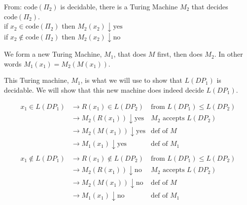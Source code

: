 From: $\text{code}(\Pi_2)$ is decidable, there is a Turing Machine $M_2$ that 
decides $\text{code}(\Pi_2)$. \\
if $x_2 \in \text{code}(\Pi_2)$ then $M_2(x_2) \downarrow \text{yes}$\\
if $x_2 \notin \text{code}(\Pi_2)$ then $M_2(x_2) \downarrow \text{no}$

We form a new Turing Machine, $M_1$, that does $M$ first, 
then does $M_2$. In other words $M_1(x_1) = M_2(M(x_1))$.



This Turing machine, $M_1$, is what we will use to show that $L(DP_1)$ is decidable.
We will show that this new machine does indeed decide $L(DP_1)$.

\[ 
\begin{array}{rll}
x_1 \in L(DP_1) &\rightarrow  R(x_1) \in L(DP_2) & \text{from } L(DP_1) \leqslant L(DP_2) \\
               &\rightarrow  M_2(R(x_1)) \downarrow \text{yes} & M_2 \text{ accepts } L(DP_2)  \\
               &\rightarrow  M_2(M(x_1)) \downarrow \text{yes} & \text{def of } M \\
               &\rightarrow  M_1(x_1) \downarrow \text{yes} & \text{def of } M_1  \\
               & & \\
x_1 \notin L(DP_1) &\rightarrow  R(x_1) \notin L(DP_2) & \text{from } L(DP_1) \leqslant L(DP_2) \\
               &\rightarrow  M_2(R(x_1)) \downarrow \text{no} & M_2 \text{ accepts } L(DP_2)  \\
               &\rightarrow  M_2(M(x_1)) \downarrow \text{no} & \text{def of } M \\
               &\rightarrow  M_1(x_1) \downarrow \text{no} & \text{def of } M_1  \\
\end{array}
\]

